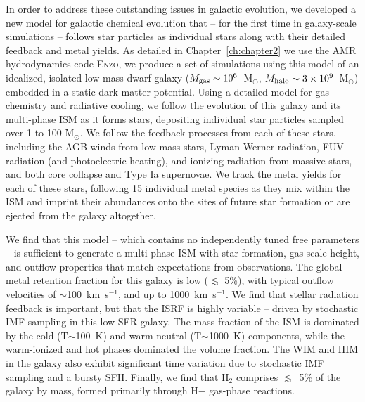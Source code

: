 In order to address these outstanding issues in galactic evolution, we developed a new model for galactic chemical evolution that -- for the first time in galaxy-scale simulations -- follows star particles as individual stars along with their detailed feedback and metal yields. As detailed in Chapter~\ref{ch:chapter2} we use the AMR hydrodynamics code \textsc{Enzo}, we produce a set of simulations using this model of an idealized, isolated low-mass dwarf galaxy ($M_{\rm gas} \sim 10^{6}$~M$_{\odot}$, $M_{\rm halo} \sim 3 \times 10^{9}$~M$_{\odot}$) embedded in a static dark matter potential. Using a detailed model for gas chemistry and radiative cooling, we follow the evolution of this galaxy and its multi-phase ISM as it forms stars, depositing individual star particles sampled over 1 to 100 M$_{\odot}$. We follow the feedback processes from each of these stars, including the AGB winds from low mass stars, Lyman-Werner radiation, FUV radiation (and photoelectric heating), and ionizing radiation from massive stars, and both core collapse and Type Ia supernovae. We track the metal yields for each of these stars, following 15 individual metal species as they mix within the ISM and imprint their abundances onto the sites of future star formation or are ejected from the galaxy altogether.

We find that this model -- which contains no independently tuned free parameters -- is sufficient to generate a multi-phase ISM with star formation, gas scale-height, and outflow properties that match expectations from observations. The global metal retention fraction for this galaxy is low ($\lesssim$ 5\%), with typical outflow velocities of $\sim$100~km~s$^{-1}$, and up to 1000~km~s$^{-1}$. We find that stellar radiation feedback is important, but that the ISRF is highly variable -- driven by stochastic IMF sampling in this low SFR galaxy. The mass fraction of the ISM is dominated by the cold (T$\sim$100~K) and warm-neutral (T$\sim$1000~K) components, while the warm-ionized and hot phases dominated the volume fraction. The WIM and HIM in the galaxy also exhibit significant time variation due to stochastic IMF sampling and a bursty SFH. Finally, we find that H$_2$ comprises $\lesssim$~5\% of the galaxy by mass, formed primarily through H$-$ gas-phase reactions.

